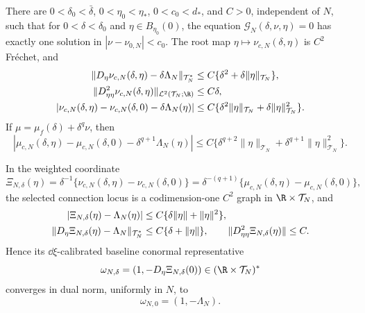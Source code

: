\begin{theorem}
There are \(0<\delta_0<\bar\delta\), \(0<\eta_0<\eta_*\),
\(0<c_0<d_*\), and \(C>0\), independent of \(N\), such that
for \(0<\delta<\delta_0\) and
\(\eta\in B_{\eta_0}(0)\), the equation
\(\mathscr G_N(\delta,\nu,\eta)=0\) has exactly one solution in
\(|\nu-\nu_{0,N}|<c_0\).  The root map
\(\eta\mapsto\nu_{c,N}(\delta,\eta)\) is \(C^2\) Fr\'{e}chet, and
\begin{align}
 \|D_\eta\nu_{c,N}(\delta,\eta)-\delta\Lambda_N\|_{\mathcal T_N^*}
 &\le C\{\delta^2+\delta\|\eta\|_{\mathcal T_N}\},
                                                               \label{eq:ball-root-derivative}\\
 \|D_{\eta\eta}^2\nu_{c,N}(\delta,\eta)\|_{\mathcal L^2(\mathcal T_N;\R)}
 &\le C\delta,                                      \label{eq:ball-root-second-derivative}\\
 |\nu_{c,N}(\delta,\eta)-\nu_{c,N}(\delta,0)
       -\delta\Lambda_N(\eta)|
 &\le C\{\delta^2\|\eta\|_{\mathcal T_N}
          +\delta\|\eta\|_{\mathcal T_N}^2\}.    \label{eq:ball-root-increment}
\end{align}
If \(\mu=\mu_f(\delta)+\delta^q\nu\), then
\begin{equation}
 |\mu_{c,N}(\delta,\eta)-\mu_{c,N}(\delta,0)
       -\delta^{q+1}\Lambda_N(\eta)|
 \le C\{\delta^{q+2}\|\eta\|_{\mathcal T_N}
          +\delta^{q+1}\|\eta\|_{\mathcal T_N}^2\}.          \label{eq:ball-physical-increment}
\end{equation}

In the weighted coordinate
\begin{equation}
 \Xi_{N,\delta}(\eta)
 =\delta^{-1}\{\nu_{c,N}(\delta,\eta)
                      -\nu_{c,N}(\delta,0)\}
 =\delta^{-(q+1)}\{\mu_{c,N}(\delta,\eta)
                      -\mu_{c,N}(\delta,0)\},        \label{eq:ball-weighted-graph}
\end{equation}
the selected connection locus is a codimension-one \(C^2\) graph in
\(\R\times\mathcal T_N\), and
\begin{align}
 |\Xi_{N,\delta}(\eta)-\Lambda_N(\eta)|
 &\le C\{\delta\|\eta\|+\|\eta\|^2\},\notag\\
 \|D_\eta\Xi_{N,\delta}(\eta)-\Lambda_N\|_{\mathcal T_N^*}
 &\le C\{\delta+\|\eta\|\},
 \qquad
 \|D_{\eta\eta}^2\Xi_{N,\delta}(\eta)\|\le C.    \label{eq:ball-weighted-jet}
\end{align}
Hence its \(\dd\xi\)-calibrated baseline conormal representative
\begin{equation}
 \omega_{N,\delta}
 =(1,-D_\eta\Xi_{N,\delta}(0))
 \in(\R\times\mathcal T_N)^*                         \label{eq:ball-conormal}
\end{equation}
converges in dual norm, uniformly in \(N\), to
\begin{equation}
 \omega_{N,0}=(1,-\Lambda_N).                        \label{eq:ball-limiting-conormal}
\end{equation}
\end{theorem}

